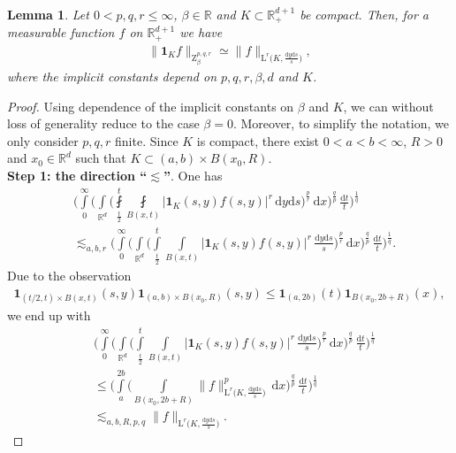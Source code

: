 \documentclass[11pt, leqno,parskip=half]{amsart}
\newtheorem{lemma}[theorem]{Lemma}
\theoremstyle{definition}
\newcommand{\IR}{\mathbb{R}}
\renewcommand{\L}{\mathrm{L}}
\newcommand{\Z}{\mathrm{Z}}
\renewcommand{\d}{\mathrm{d}}
\numberwithin{equation}{section}
\begin{document}
\begin{lemma}
\label{lem: compare Z with Lr}
    Let $0<p,q,r\leq \infty$, $\beta\in \IR$ and $K\subset \IR^{d+1}_+$ be compact. Then, for a measurable function $f$ on $\IR^{d+1}_+$ we have
    \begin{align*}
        \|\mathbf{1}_K f \|_{\Z^{p,q,r}_\beta} \simeq \|f\|_{\L^{r}\big(K,\frac{\d y \d s}{s}\big)},
    \end{align*}
    where the implicit constants depend on $p,q,r,\beta,d$ and $K$.
\end{lemma}

\begin{proof}
    Using dependence of the implicit constants on $\beta$ and $K$, we can without loss of generality reduce to the case $\beta = 0$. Moreover, to simplify the notation, we only consider $p,q,r$ finite.
    Since $K$ is compact, there exist $0<a<b<\infty$, $R>0$ and $x_0\in \IR^{d}$ such that $K\subset (a,b)\times B(x_0,R)$.\\

    \noindent\textbf{Step 1: the direction \enquote{$\lesssim$}}. One has
    \begin{align*}
        &\bigg(\int\limits_{0}^\infty \bigg(\int\limits_{\IR^d}\bigg(\fint\limits_{\frac{t}{2}}^t \fint\limits_{B(x,t)} |\mathbf{1}_K(s,y)f(s,y)|^r \, \d y \d s\bigg)^\frac{p}{r}\,\d x \bigg)^\frac{q}{p}\,\frac{\d t}{t}\bigg)^\frac{1}{q}\\
        &\lesssim_{a,b,r} \bigg(\int\limits_{0}^\infty \bigg(\int\limits_{\IR^d}\bigg(\int\limits_{\frac{t}{2}}^t \int\limits_{B(x,t)} |\mathbf{1}_K(s,y)f(s,y)|^r \,\frac{\d y \d s}{s}\bigg)^\frac{p}{r}\,\d x \bigg)^\frac{q}{p}\,\frac{\d t}{t}\bigg)^\frac{1}{q}.
    \end{align*}
    Due to the observation
    \begin{align*}
        \mathbf{1}_{(t/2,t)\times B(x,t)}(s,y) \mathbf{1}_{(a,b)\times B(x_0,R)}(s,y)\leq \mathbf{1}_{(a,2b)}(t) \mathbf{1}_{B(x_0,2b+R)}(x),
    \end{align*}
    we end up with
    \begin{align*}
        &\bigg(\int\limits_{0}^\infty \bigg(\int\limits_{\IR^d}\bigg(\int\limits_{\frac{t}{2}}^t \int\limits_{B(x,t)} |\mathbf{1}_K(s,y)f(s,y)|^r \, \frac{\d y \d s}{s}\bigg)^\frac{p}{r}\,\d x \bigg)^\frac{q}{p}\,\frac{\d t}{t}\bigg)^\frac{1}{q} \\
        &\leq \bigg(\int\limits_{a}^{2b}\bigg(\int\limits_{B(x_0,2b+R)} \| f\|_{\L^r\big(K,\frac{\d y \d s}{s}\big)}^p\,\d x \bigg)^\frac{q}{p}\,\frac{\d t}{t}\bigg)^\frac{1}{q}\\
        &\lesssim_{a,b,R,p,q}  \|f\|_{\L^r\big(K,\frac{\d y \d s}{s}\big)}.
    \end{align*}


\end{proof}
\end{document}
